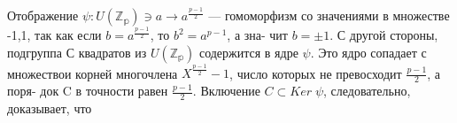 \documentclass{../template/mai_book}
\begin{document}
\begin{myproof}
 Отображение $\psi : U(\mathbb{Z_{p}}) \owns a \to a^{\frac{p-1}{2}}$ --- гомоморфизм со значениями \linebreak  в множестве {-1,1}, так как если $b = a^{\frac{p-1}{2}}$, то $b^{2} = a^{p-1}$, а зна- \linebreak чит $b = \pm 1$. С другой стороны, подгруппа С квадратов из $U(\mathbb{Z_{p}})$ \linebreak содержится в ядре $\psi$. Это ядро сопадает с множествои корней \linebreak многочлена $X^{\frac{p-1}{2}} - 1$, число которых не превосходит $\frac{p-1}{2}$, а поря- \linebreak док C в точности равен $\frac{p-1}{2}$. Включение $C \subset Ker \; \psi$, следовательно, доказывает, что
\end{myproof}
\end{document}
